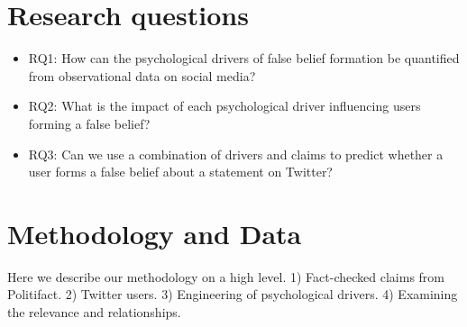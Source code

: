 \documentclass[
10pt, %
a4paper, %
oneside, %
headinclude,footinclude, %
] {book}%
\begin{document}

\section{Research questions}

\begin{itemize}
    \item RQ1: How can the psychological drivers of false belief formation be quantified from observational data on social media?
    
    
    \item RQ2: What is the impact of each psychological driver influencing users forming a false belief?
    
    \item RQ3: Can we use a combination of drivers and claims to predict whether a user forms a false belief about a statement on Twitter?
\end{itemize}

\section{Methodology and Data}

Here we describe our methodology on a high level. 1) Fact-checked claims from Politifact. 2) Twitter users. 3) Engineering of psychological drivers. 4) Examining the relevance and relationships.
\end{document}

